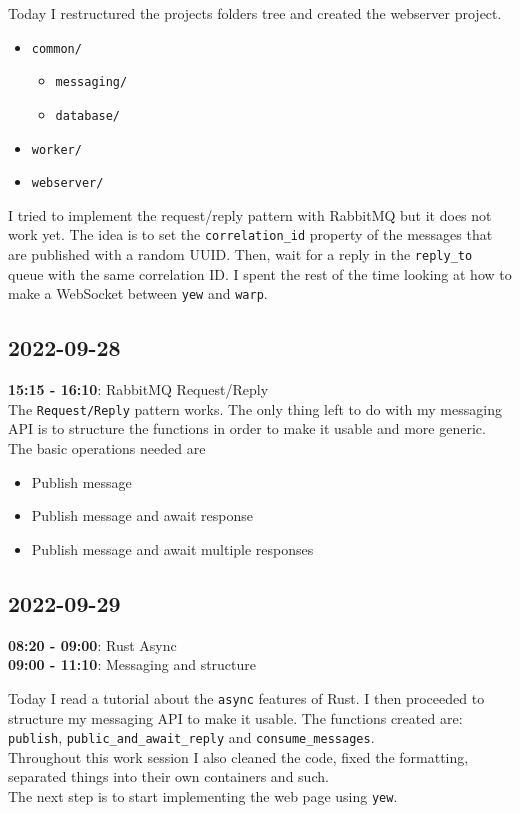 \documentclass{article}
\begin{document}
Today I restructured the projects folders tree and created the webserver project.
\begin{itemize}
    \item \texttt{common/}
    \begin{itemize}
        \item \texttt{messaging/}
        \item \texttt{database/}
    \end{itemize}
    \item \texttt{worker/}
    \item \texttt{webserver/}
\end{itemize}
I tried to implement the request/reply pattern with RabbitMQ but it does not work yet.
The idea is to set the \texttt{correlation\_id} property of the messages that are published with a random
UUID. Then, wait for a reply in the \texttt{reply\_to} queue with the same correlation ID.
I spent the rest of the time looking at how to make a WebSocket between \texttt{yew}
and \texttt{warp}.

\subsection{2022-09-28}

\textbf{15:15 - 16:10}: RabbitMQ Request/Reply \\

The \texttt{Request/Reply} pattern works. The only thing left to do
with my messaging API is to structure the functions in order to make it
usable and more generic. The basic operations needed are
\begin{itemize}
    \item Publish message
    \item Publish message and await response
    \item Publish message and await multiple responses
\end{itemize}

\subsection{2022-09-29}

\textbf{08:20 - 09:00}: Rust Async \\
\textbf{09:00 - 11:10}: Messaging and structure

Today I read a tutorial about the \texttt{async} features of Rust.
I then proceeded to structure my messaging API to make it usable.
The functions created are: \texttt{publish}, \texttt{public\_and\_await\_reply}
and \texttt{consume\_messages}. \\
Throughout this work session I also cleaned the code, fixed the
formatting, separated things into their own containers and such. \\
The next step is to start implementing the web page using \texttt{yew}.
\end{document}
